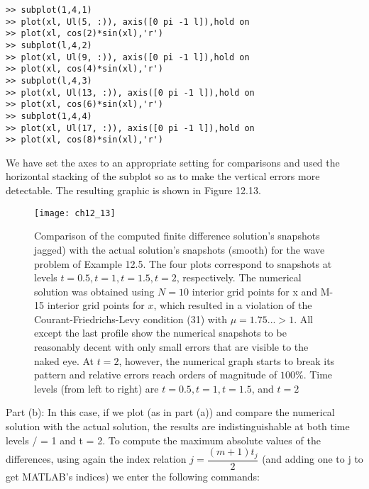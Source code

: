 \documentclass[../main.tex]{subfiles}
\begin{document}
\begin{lstlisting}[numbers=none,frame=none]
>> subplot(1,4,1) 
>> plot(xl, Ul(5, :)), axis([0 pi -1 l]),hold on 
>> plot(xl, cos(2)*sin(xl),'r') 
>> subplot(l,4,2) 
>> plot(xl, Ul(9, :)), axis([0 pi -1 l]),hold on 
>> plot(xl, cos(4)*sin(xl),'r') 
>> subplot(l,4,3) 
>> plot(xl, Ul(13, :)), axis([0 pi -1 l]),hold on 
>> plot(xl, cos(6)*sin(xl),'r') 
>> subplot(1,4,4) 
>> plot(xl, Ul(17, :)), axis([0 pi -1 l]),hold on 
>> plot(xl, cos(8)*sin(xl),'r') 
\end{lstlisting}
We have set the axes to an appropriate setting for comparisons and used the horizontal stacking of the subplot so as to make the vertical errors more detectable. 
The resulting graphic is shown in Figure 12.13.

\begin{figure}[H]
	\centering
	\texttt{[image: ch12\_13]}
	\caption{\textsf{Comparison of the computed finite difference solution's snapshots jagged) with the actual solution's snapshots (smooth) for the wave problem of Example 12.5. The four plots correspond to snapshots at  levels $t = 0.5, t = 1, t = 1.5, t = 2$, respectively. The numerical solution was obtained using $N=10$ interior grid points for x and M- 15 interior grid points for $x$, which resulted in a violation of the Courant-Friedrichs-Levy condition (31) with $\mu = 1.75... > 1$. All except the last profile show the numerical snapshots to be reasonably decent with only small errors that are  visible to the naked eye. At $t = 2$, however, the numerical graph starts to break its pattern and relative errors reach orders of magnitude of $100\%$. Time levels (from left to right) are $t = 0.5, t = 1, t = 1.5$, and $t =2$}}
	\label{pfig:ch12_13}
\end{figure}
Part (b): In this case, if we plot (as in part (a)) and compare the numerical solution with the actual solution, the results are indistinguishable at both time levels / = 1 and t = 2. To compute the maximum absolute values of the differences, using again the index relation $j=\dfrac{(m+1)t_j}{2}$ (and adding one to j to get MATLAB's indices) we enter the following commands: 
\end{document}
